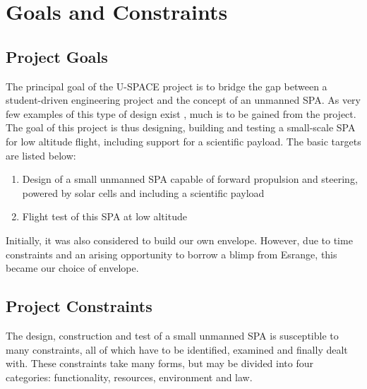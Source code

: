 \chapter{Goals and Constraints}
\label{chap:goals_constraints}
%
\section{Project Goals}
\label{sec:goals}
%
The principal goal of the \ac{U-SPACE} project is to bridge the gap between a student-driven engineering project and the concept of an unmanned \ac{SPA}. As very few examples of this type of design exist \cite{website:solr}, much is to be gained from the project. The goal of this project is thus designing, building and testing a small-scale \ac{SPA} for low altitude flight, including support for a scientific payload. The basic targets are listed below:
%
\begin{enumerate}
\item Design of a small unmanned \ac{SPA} capable of forward propulsion and steering, powered by solar cells and including a scientific payload
\item Flight test of this \ac{SPA} at low altitude
\end{enumerate}
%
Initially, it was also considered to build our own envelope. However, due to time constraints and an arising opportunity to borrow a blimp from Esrange, this became our choice of envelope.
%
\section{Project Constraints}
\label{sec:constraints}
%
The design, construction and test of a small unmanned \ac{SPA} is susceptible to many constraints, all of which have to be identified, examined and finally dealt with. These constraints take many forms, but may be divided into four categories: functionality, resources, environment and law.
%
